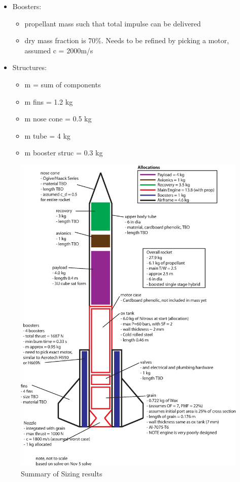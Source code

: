 \documentclass[12pt]{article}
\begin{document}
\begin{itemize}
\begin{itemize}
\begin{itemize}
\end{itemize}
\item Boosters:
\begin{itemize}
\item propellant mass such that total impulse can be delivered
\item dry mass fraction is 70\%. Needs to be refined by picking a motor, assumed c = 2000m/s
\end{itemize}
\item Structures:
\begin{itemize}
\item m = sum of components
\item m fins = 1.2 kg
\item m nose cone = 0.5 kg
\item m tube = 4 kg
\item m  booster struc = 0.3 kg
\end{itemize}
\end{itemize}

\end{itemize}


\FloatBarrier
\begin{figure}[htbp]
   \centering
   \includegraphics[width=\linewidth]{sizing_result_Nov_5.eps}
   \caption{Summary of Sizing results}
   \label{fig:}
\end{figure}
\end{document}
